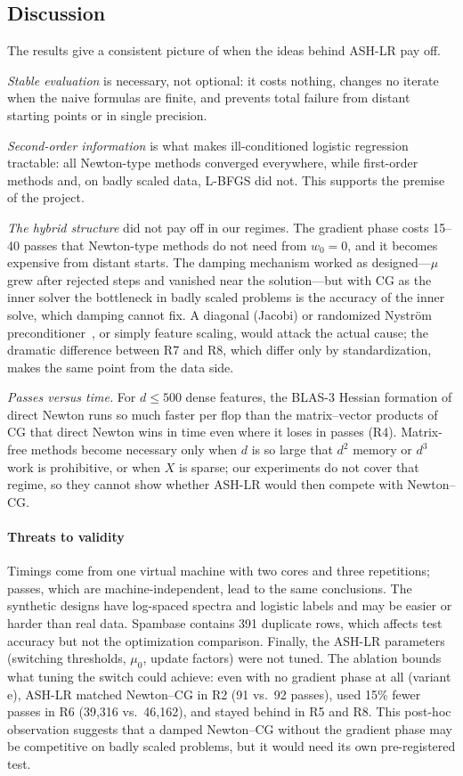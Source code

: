 \subsection{Discussion}
The results give a consistent picture of when the ideas behind ASH-LR pay off.

\emph{Stable evaluation} is necessary, not optional: it costs nothing, changes no
iterate when the naive formulas are finite, and prevents total failure from distant
starting points or in single precision.

\emph{Second-order information} is what makes ill-conditioned logistic regression
tractable: all Newton-type methods converged everywhere, while first-order methods
and, on badly scaled data, L-BFGS did not. This supports the premise of the project.

\emph{The hybrid structure} did not pay off in our regimes. The gradient phase costs
15--40 passes that Newton-type methods do not need from $w_0=0$, and it becomes
expensive from distant starts. The damping mechanism worked as designed---$\mu$
grew after rejected steps and vanished near the solution---but with CG as the inner
solver the bottleneck in badly scaled problems is the accuracy of the inner solve,
which damping cannot fix. A diagonal (Jacobi) or randomized Nystr\"om
preconditioner~\cite{frangella2023randomized}, or simply feature scaling, would
attack the actual cause; the dramatic difference between R7 and R8, which differ
only by standardization, makes the same point from the data side.

\emph{Passes versus time.} For $d\le500$ dense features, the BLAS-3 Hessian
formation of direct Newton runs so much faster per flop than the matrix--vector
products of CG that direct Newton wins in time even where it loses in passes (R4).
Matrix-free methods become necessary only when $d$ is so large that $d^2$ memory or
$d^3$ work is prohibitive, or when $X$ is sparse; our experiments do not cover that
regime, so they cannot show whether ASH-LR would then compete with Newton--CG.

\paragraph{Threats to validity} Timings come from one virtual machine with two cores
and three repetitions; passes, which are machine-independent, lead to the same
conclusions. The synthetic designs have log-spaced spectra and logistic labels and
may be easier or harder than real data. Spambase contains 391 duplicate rows, which
affects test accuracy but not the optimization comparison. Finally, the ASH-LR
parameters (switching thresholds, $\mu_0$, update factors) were not tuned. The
ablation bounds what tuning the switch could achieve: even with no gradient phase at
all (variant e), ASH-LR matched Newton--CG in R2 (91 vs.\ 92 passes), used 15\%
fewer passes in R6 (39,316 vs.\ 46,162), and stayed behind in R5 and R8. This
post-hoc observation suggests that a damped Newton--CG without the gradient phase may
be competitive on badly scaled problems, but it would need its own pre-registered
test.

